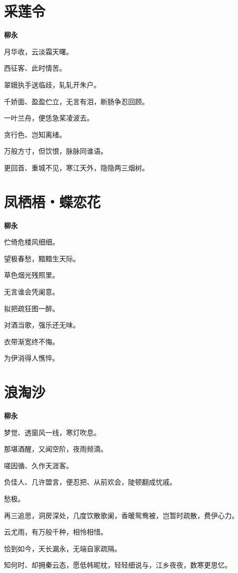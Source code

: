 \documentclass[12pt,a4paper]{ctexbook}
\begin{document}
\section{采莲令}
\textbf{柳永}\par\vspace{0.5em}
月华收，云淡霜天曙。\par
西征客、此时情苦。\par
翠娥执手送临歧，轧轧开朱户。\par
千娇面、盈盈伫立，无言有泪，断肠争忍回顾。\par
一叶兰舟，便恁急桨凌波去。\par
贪行色、岂知离绪。\par
万般方寸，但饮恨，脉脉同谁语。\par
更回首、重城不见，寒江天外，隐隐两三烟树。\par

\section{凤栖梧・蝶恋花}
\textbf{柳永}\par\vspace{0.5em}
伫倚危楼风细细。\par
望极春愁，黯黯生天际。\par
草色烟光残照里。\par
无言谁会凭阑意。\par
拟把疏狂图一醉。\par
对酒当歌，强乐还无味。\par
衣带渐宽终不悔。\par
为伊消得人憔悴。\par

\section{浪淘沙}
\textbf{柳永}\par\vspace{0.5em}
梦觉、透窗风一线，寒灯吹息。\par
那堪酒醒，又闻空阶，夜雨频滴。\par
嗟因循、久作天涯客。\par
负佳人、几许盟言，便忍把、从前欢会，陡顿翻成忧戚。\par
愁极。\par
再三追思，洞房深处，几度饮散歌阑，香暖鸳鸯被，岂暂时疏散，费伊心力。\par
云尤雨，有万般千种，相怜相惜。\par
恰到如今，天长漏永，无端自家疏隔。\par
知何时、却拥秦云态，愿低帏昵枕，轻轻细说与，江乡夜夜，数寒更思忆。\par
\end{document}
